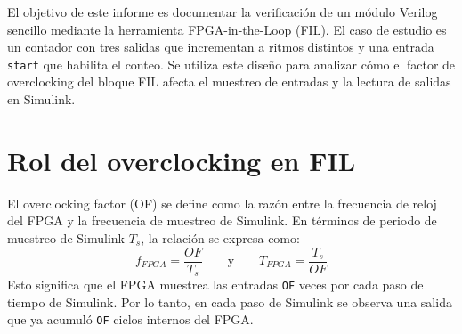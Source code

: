 El objetivo de este informe es documentar la verificación de un módulo Verilog sencillo mediante la herramienta FPGA-in-the-Loop (FIL). El caso de estudio es un contador con tres salidas que incrementan a ritmos distintos y una entrada \texttt{start} que habilita el conteo. Se utiliza este diseño para analizar cómo el factor de overclocking del bloque FIL afecta el muestreo de entradas y la lectura de salidas en Simulink.

\section{Rol del overclocking en FIL}
El overclocking factor (OF) se define como la razón entre la frecuencia de reloj del FPGA y la frecuencia de muestreo de Simulink. En términos de periodo de muestreo de Simulink $T_s$, la relación se expresa como:
\[
f_{FPGA} = \frac{OF}{T_s}
\qquad \text{y} \qquad
T_{FPGA} = \frac{T_s}{OF}
\]
Esto significa que el FPGA muestrea las entradas \texttt{OF} veces por cada paso de tiempo de Simulink. Por lo tanto, en cada paso de Simulink se observa una salida que ya acumuló \texttt{OF} ciclos internos del FPGA.
